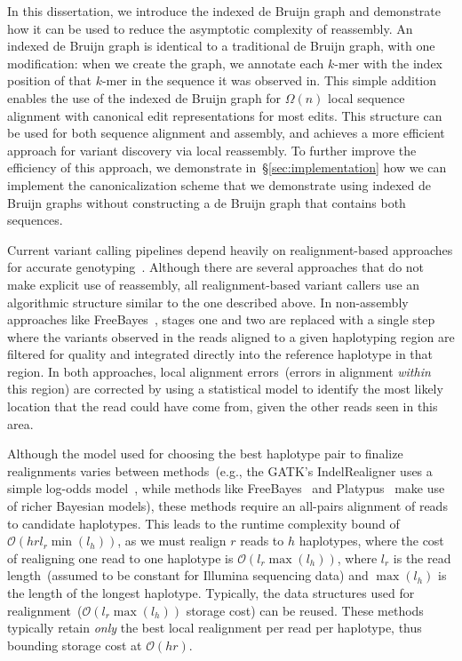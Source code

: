 \documentclass[phd]{ucbthesis}
\begin{document}
In this dissertation, we introduce the indexed de Bruijn graph and demonstrate how it can be used to
reduce the asymptotic complexity of reassembly. An indexed de Bruijn graph is identical to a
traditional de Bruijn graph, with one modification: when we create the graph, we annotate each
$k$-mer with the index position of that $k$-mer in the sequence it was observed in. This simple addition
enables the use of the indexed de Bruijn graph for $\Omega(n)$ local sequence alignment with
canonical edit representations for most edits. This structure can be used for both sequence alignment and
assembly, and achieves a more efficient approach for variant discovery via local reassembly.
To further improve the efficiency of this approach, we demonstrate in~\S\ref{sec:implementation}
how we can implement the canonicalization scheme that we demonstrate using indexed de Bruijn
graphs without constructing a de Bruijn graph that contains both sequences.

Current variant calling pipelines depend heavily on realignment-based approaches for accurate
genotyping~\cite{li14}. Although there are several approaches that do not make explicit use of reassembly,
all realignment-based variant callers use an algorithmic structure similar to the one described
above. In non-assembly approaches like {FreeBayes}~\cite{garrison12}, stages
one and two are replaced with a single step where the variants observed in the reads aligned to a given
haplotyping region are filtered for quality and integrated directly into the reference haplotype in that region.
In both approaches, local alignment errors~(errors in alignment \emph{within} this region) are corrected
by using a statistical model to identify the most likely location that the read could have come from, given
the other reads seen in this area.

Although the model used for choosing the best haplotype pair to finalize realignments varies between
methods~(e.g., the GATK's {IndelRealigner} uses a simple log-odds model~\cite{depristo11}, while
methods like {FreeBayes}~\cite{garrison12} and {Platypus}~\cite{rimmer14} make use of richer
Bayesian models), these methods require an all-pairs alignment of reads to candidate
haplotypes. This leads to the runtime complexity bound of $\mathcal{O}(h r l_r \min(l_h))$,
as we must realign $r$ reads to $h$ haplotypes, where the cost of realigning
one read to one haplotype is $\mathcal{O}(l_r \max(l_h))$, where $l_r$ is the read length~(assumed to be
constant for Illumina sequencing data) and $\max(l_h)$ is the length of the longest haplotype. Typically,
the data structures used for realignment~($\mathcal{O}(l_r \max(l_h))$ storage cost) can be reused.
These methods typically retain \emph{only} the best local realignment per read per haplotype, thus
bounding storage cost at $\mathcal{O}(h r)$.
\end{document}

